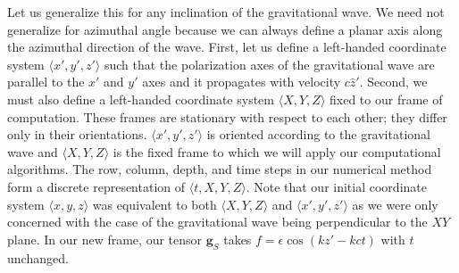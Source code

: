\documentclass{article}
\begin{document}
Let us generalize this for any inclination of the gravitational wave. We need not generalize for azimuthal angle because we can always define a planar axis along the azimuthal direction of the wave. First, let us define a left-handed coordinate system $\langle x',y',z'\rangle$ such that the polarization axes of the gravitational wave are parallel to the $x'$ and $y'$ axes and it propagates with velocity $c \hat z'$. Second, we must also define a left-handed coordinate system $\langle X,Y,Z \rangle$ fixed to our frame of computation. These frames are stationary with respect to each other; they differ only in their orientations. $\langle x',y',z'\rangle$ is oriented according to the gravitational wave and $\langle X,Y,Z \rangle$ is the fixed frame to which we will apply our computational algorithms. The row, column, depth, and time steps in our numerical method form a discrete representation of $\langle t,X,Y,Z \rangle$. Note that our initial coordinate system $\langle x,y,z\rangle$ was equivalent to both $\langle X,Y,Z\rangle$ and $\langle x',y',z'\rangle$ as we were only concerned with the case of the gravitational wave being perpendicular to the $XY$ plane. In our new frame, our tensor $\textbf{g}_S$ takes $f=\epsilon \cos(kz'-kct)$ with $t$ unchanged.
\end{document}
